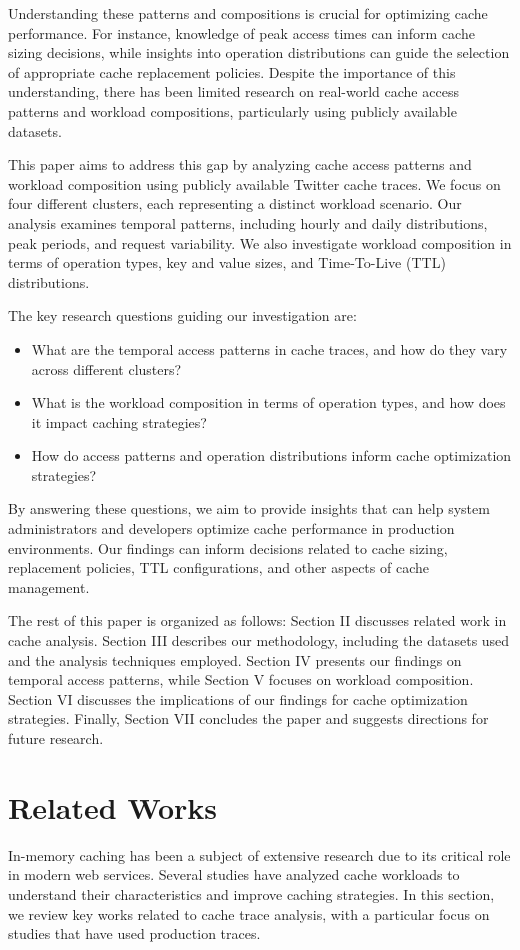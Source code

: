 \documentclass[conference]{IEEEtran}
\begin{document}
Understanding these patterns and compositions is crucial for optimizing cache performance. For instance, knowledge of peak access times can inform cache sizing decisions, while insights into operation distributions can guide the selection of appropriate cache replacement policies. Despite the importance of this understanding, there has been limited research on real-world cache access patterns and workload compositions, particularly using publicly available datasets.

This paper aims to address this gap by analyzing cache access patterns and workload composition using publicly available Twitter cache traces. We focus on four different clusters, each representing a distinct workload scenario. Our analysis examines temporal patterns, including hourly and daily distributions, peak periods, and request variability. We also investigate workload composition in terms of operation types, key and value sizes, and Time-To-Live (TTL) distributions.

The key research questions guiding our investigation are:
\begin{itemize}
    \item What are the temporal access patterns in cache traces, and how do they vary across different clusters?
    \item What is the workload composition in terms of operation types, and how does it impact caching strategies?
    \item How do access patterns and operation distributions inform cache optimization strategies?
\end{itemize}

By answering these questions, we aim to provide insights that can help system administrators and developers optimize cache performance in production environments. Our findings can inform decisions related to cache sizing, replacement policies, TTL configurations, and other aspects of cache management.

The rest of this paper is organized as follows: Section II discusses related work in cache analysis. Section III describes our methodology, including the datasets used and the analysis techniques employed. Section IV presents our findings on temporal access patterns, while Section V focuses on workload composition. Section VI discusses the implications of our findings for cache optimization strategies. Finally, Section VII concludes the paper and suggests directions for future research.

\section{Related Works}
In-memory caching has been a subject of extensive research due to its critical role in modern web services. Several studies have analyzed cache workloads to understand their characteristics and improve caching strategies. In this section, we review key works related to cache trace analysis, with a particular focus on studies that have used production traces.
\end{document}
